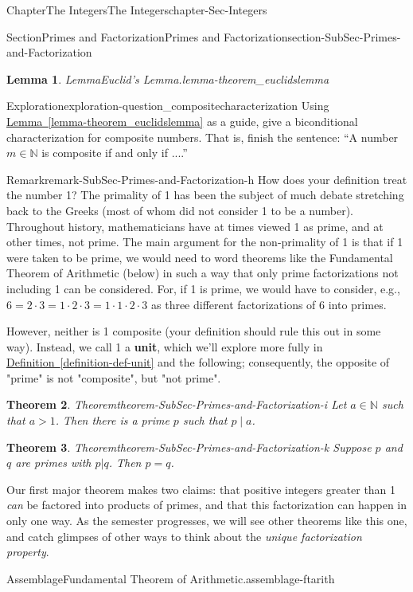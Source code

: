 \documentclass[oneside,10pt,]{book}
\newcommand{\xreffont}{\relax}
\newcommand{\terminology}[1]{\textbf{#1}}
\numberwithin{equation}{section}
\def\N{{\mathbb N}}
\newtheorem{theorem}{Theorem}[section]
\newtheorem{lemma}[theorem]{Lemma}
\begin{document}
\begin{chapterptx}{Chapter}{The Integers}{}{The Integers}{}{}{chapter-Sec-Integers}
\begin{sectionptx}{Section}{Primes and Factorization}{}{Primes and Factorization}{}{}{section-SubSec-Primes-and-Factorization}
\begin{lemma}{Lemma}{Euclid's Lemma.}{}{lemma-theorem_euclidslemma}
\end{lemma}
\begin{exploration}{Exploration}{}{exploration-question_compositecharacterization}%
Using \hyperref[lemma-theorem_euclidslemma]{Lemma~{\xreffont\ref{lemma-theorem_euclidslemma}}} as a guide, give a biconditional characterization for composite numbers. That is, finish the sentence: ``A number \(m\in\N\) is composite if and only if ....''%
\end{exploration}%
\begin{remark}{Remark}{}{remark-SubSec-Primes-and-Factorization-h}%
How does your definition treat the number 1? The primality of 1 has been the subject of much debate stretching back to the Greeks (most of whom did not consider 1 to be a number). Throughout history, mathematicians have at times viewed 1 as prime, and at other times, not prime. The main argument for the non-primality of 1 is that if 1 were taken to be prime, we would need to word theorems like the Fundamental Theorem of Arithmetic (below) in such a way that only prime factorizations not including 1 can be considered. For, if 1 is prime, we would have to consider, e.g., \(6 = 2\cdot 3 = 1\cdot 2 \cdot 3 = 1\cdot 1\cdot 2\cdot 3\) as three different factorizations of 6 into primes.%
\par
However, neither is 1 composite (your definition should rule this out in some way). Instead, we call 1 a \terminology{unit}, which we'll explore more fully in \hyperref[definition-def-unit]{Definition~{\xreffont\ref{definition-def-unit}}} and the following; consequently, the opposite of "prime" is not "composite", but "not prime".%
\end{remark}
\begin{theorem}{Theorem}{}{}{theorem-SubSec-Primes-and-Factorization-i}%
Let \(a\in \N\) such that \(a > 1\). Then there is a prime \(p\) such that \(p\mid a\).%
\end{theorem}
\begin{theorem}{Theorem}{}{}{theorem-SubSec-Primes-and-Factorization-k}%
Suppose \(p\) and \(q\) are primes with \(p|q\). Then \(p = q\).%
\end{theorem}
Our first major theorem makes two claims: that positive integers greater than 1 \emph{can} be factored into products of primes, and that this factorization can happen in only one way. As the semester progresses, we will see other theorems like this one, and catch glimpses of other ways to think about the \emph{unique factorization property}.%
\begin{assemblage}{Assemblage}{Fundamental Theorem of Arithmetic.}{assemblage-ftarith}%

\end{assemblage}
\end{sectionptx}
\end{chapterptx}
\end{document}
